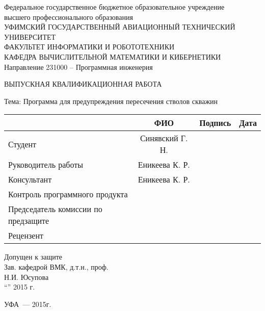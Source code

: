 \begin{titlepage}
\newpage

\begin{center}
Федеральное государственное бюджетное образовательное учреждение\\
высшего профессионального образования \\
\vspace{0.5cm}
УФИМСКИЙ ГОСУДАРСТВЕННЫЙ АВИАЦИОННЫЙ ТЕХНИЧЕСКИЙ УНИВЕРСИТЕТ\\
\vspace{0.5cm}
ФАКУЛЬТЕТ  ИНФОРМАТИКИ  И  РОБОТОТЕХНИКИ \\
\vspace{0.5cm}
КАФЕДРА  ВЫЧИСЛИТЕЛЬНОЙ  МАТЕМАТИКИ  И  КИБЕРНЕТИКИ\\
\vspace{0.5cm}
Направление 231000 – Программная инженерия
\end{center}

\vspace{2em}

\begin{center}
\Large {ВЫПУСКНАЯ КВАЛИФИКАЦИОННАЯ РАБОТА}

\vspace{2.5em}

Тема: Программа для предупреждения пересечения стволов скважин
\end{center}

\vspace{3em}
\noindent
\begin{tabularx}{\textwidth}{|l|c|X|X|}
\hline
& ФИО & Подпись & Дата\\
\hline
Студент & Синявский Г. Н. &&\\
\hline
Руководитель работы & Еникеева К. Р. &&\\
\hline
Консультант & Еникеева К. Р. &&\\
\hline
Контроль программного продукта &&&\\
\hline
Председатель комиссии по предзащите &&&\\
\hline
Рецензент &&& \\
\hline
\end{tabularx}

\vspace{2em}
\center Допущен к защите\\
Зав. кафедрой  ВМК, д.т.н., проф.\\
\underline{\hspace{5cm}} Н.И. Юсупова\\
“\underline{\hspace{1cm}}”\underline{\hspace{5cm}} 2015 г.

\vspace{\fill}

\begin{center}
УФА~--- 2015г.
\end{center}

\end{titlepage}
